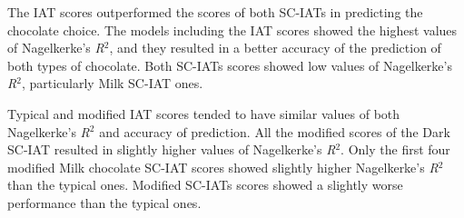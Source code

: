 \documentclass[12pt]{book}
\begin{document}
The IAT scores outperformed the scores of both SC-IATs  in predicting the chocolate choice. 
The models including the IAT scores showed the highest values of Nagelkerke's \emph{R}$^2$, and they resulted in a better accuracy of the prediction of both types of chocolate. Both SC-IATs scores showed low values of Nagelkerke's \emph{R}$^2$, particularly Milk SC-IAT ones. 

Typical and modified IAT scores tended to have similar values of both Nagelkerke’s \emph{R}$^2$ and accuracy of prediction. 
All the modified scores of the Dark SC-IAT resulted in slightly higher values of Nagelkerke’s \emph{R}$^2$. Only the first four modified Milk chocolate SC-IAT scores showed slightly higher Nagelkerke's \emph{R}$^2$ than the typical ones. 
Modified SC-IATs scores showed a slightly worse performance than the typical ones. 
\end{document}
